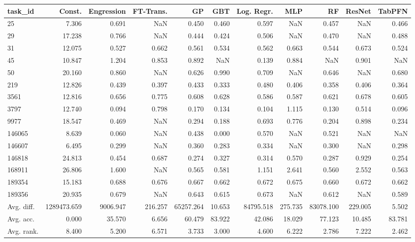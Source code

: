 \begin{tabular}{lrrrrrrrrrr}
\toprule
task\_id & Const. & Engression & FT-Trans. & GP & GBT & Log. Regr. & MLP & RF & ResNet & TabPFN \\
\midrule
25 & 7.306 & 0.691 & NaN & 0.450 & 0.460 & 0.597 & NaN & 0.457 & NaN & 0.466 \\
29 & 17.238 & 0.766 & NaN & 0.444 & 0.424 & 0.506 & NaN & 0.470 & NaN & 0.488 \\
31 & 12.075 & 0.527 & 0.662 & 0.561 & 0.534 & 0.562 & 0.663 & 0.544 & 0.673 & 0.524 \\
45 & 10.847 & 1.204 & 0.853 & 0.892 & NaN & 0.139 & 0.884 & NaN & 0.901 & NaN \\
50 & 20.160 & 0.860 & NaN & 0.626 & 0.990 & 0.709 & NaN & 0.646 & NaN & 0.680 \\
219 & 12.826 & 0.439 & 0.397 & 0.433 & 0.333 & 0.480 & 0.406 & 0.358 & 0.406 & 0.364 \\
3561 & 12.816 & 0.656 & 0.775 & 0.608 & 0.628 & 0.586 & 0.587 & 0.621 & 0.678 & 0.605 \\
3797 & 12.740 & 0.094 & 0.798 & 0.170 & 0.134 & 0.104 & 1.115 & 0.130 & 0.514 & 0.096 \\
9977 & 18.547 & 0.469 & NaN & 0.294 & 0.188 & 0.693 & 0.776 & 0.204 & 0.898 & 0.234 \\
146065 & 8.639 & 0.060 & NaN & 0.438 & 0.000 & 0.570 & NaN & 0.521 & NaN & NaN \\
146607 & 6.495 & 0.299 & NaN & 0.360 & 0.283 & 0.334 & NaN & 0.300 & NaN & 0.298 \\
146818 & 24.813 & 0.454 & 0.687 & 0.274 & 0.327 & 0.314 & 0.570 & 0.287 & 0.929 & 0.254 \\
168911 & 26.806 & 1.600 & NaN & 0.565 & 0.581 & 1.151 & 2.641 & 0.560 & 2.552 & 0.563 \\
189354 & 15.183 & 0.688 & 0.676 & 0.667 & 0.662 & 0.672 & 0.675 & 0.660 & 0.672 & 0.662 \\
189356 & 20.935 & 0.679 & NaN & 0.643 & 0.615 & 0.673 & NaN & 0.612 & NaN & 0.589 \\
Avg. diff. & 1289473.659 & 9006.947 & 216.257 & 65257.264 & 10.653 & 84795.518 & 275.735 & 83078.100 & 229.005 & 5.502 \\
Avg. acc. & 0.000 & 35.570 & 6.656 & 60.479 & 83.922 & 42.086 & 18.029 & 77.123 & 10.485 & 83.781 \\
Avg. rank. & 8.400 & 5.200 & 6.571 & 3.733 & 3.000 & 4.600 & 6.222 & 2.786 & 7.222 & 2.462 \\
\bottomrule
\end{tabular}
